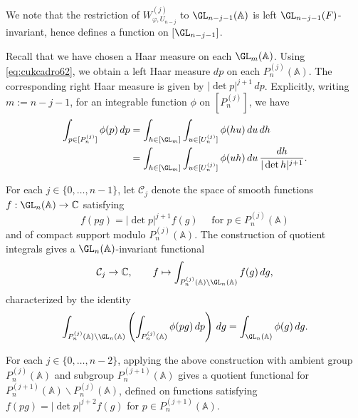We note that the restriction of $W_{\varphi,U_{n-j}}^{(j)}$ to $\GL_{n-j-1}(\mathbb{A})$ is left $\GL_{n-j-1}(F)$-invariant, hence defines a function on $[\GL_{n-j-1}]$.

Recall that we have chosen a Haar measure on each $\GL_m(\mathbb{A})$.  Using \eqref{eq:cukcadro62}, we obtain a left Haar measure $d p$ on each $P_n^{(j)}(\mathbb{A})$.  The corresponding right Haar measure is given by $\lvert \det p \rvert^{j + 1} \, d p$.  Explicitly, writing $m := n - j - 1$, for an integrable function $\phi$ on $[P_n^{(j)}]$, we have
\begin{align}
  \int_{p \in [P_n^{(j)}]} \phi(p)\, d p
  &=
  \int_{h \in [\GL_m]}
  \int_{u \in [U_n^{(j)}]}
    \phi(h u)\, d u\,
    d h \nonumber
  \\
  &= \label{eq:cujy0e5m3g}
    \int_{h \in [\GL_m]}
    \int_{u \in [U_n^{(j)}]}
    \phi(u h)\, d u\,
    \frac{d h}{|\det h|^{j + 1}}.
\end{align}

For each $j \in \{0,\dotsc,n-1\}$, let $\mathcal{C}_j$ denote the space of smooth functions $f : \GL_n(\mathbb{A}) \rightarrow \mathbb{C}$ satisfying
\begin{equation*}
  f(p g)=|\det p|^{j+1} f(g)
  \quad
  \text{ for } p \in P_n^{(j)}(\mathbb{A})
\end{equation*}
and of compact support modulo $P_n^{(j)}(\mathbb{A})$.  The construction of quotient integrals gives a $\GL_n(\mathbb{A})$-invariant functional
\begin{equation*}
  \mathcal{C}_j \rightarrow \mathbb{C},
  \qquad
  f \mapsto \int_{P_n^{(j)}(\mathbb{A}) \backslash \GL_n(\mathbb{A})}
  f(g)\, d g,
\end{equation*}
characterized by the identity
\begin{equation}\label{eq:culjy5hdwt}
  \int_{P_n^{(j)}(\mathbb{A}) \backslash \GL_n(\mathbb{A})}
  \left(
    \int_{P_n^{(j)}(\mathbb{A})}
    \phi(p g) \, d p
  \right)\, d g
  =
  \int_{\GL_n(\mathbb{A})} \phi(g)\, d g.
\end{equation}

For each $j \in \{0,\dotsc,n-2\}$, applying the above construction with ambient group $P_n^{(j)}(\mathbb{A})$ and subgroup $P_n^{(j+1)}(\mathbb{A})$ gives a quotient functional for $P_n^{(j+1)}(\mathbb{A}) \backslash P_n^{(j)}(\mathbb{A})$, defined on functions satisfying $f(p g) = \lvert \det p \rvert^{j + 2} f(g)$ for $p \in P_n^{(j + 1)}(\mathbb{A})$.

